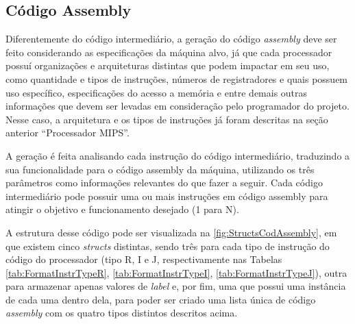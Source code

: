 \documentclass[
	12pt,				%
	oneside,
	a4paper,			%
	english,			%
	french,				%
	spanish,			%
	brazil,				%
	]{abntex2}
\begin{document}
\subsection{Código Assembly}

Diferentemente do código intermediário, a geração do código \emph{assembly} deve ser feito considerando as especificações da máquina alvo, já que cada processador possuí organizações e arquiteturas distintas que podem impactar em seu uso, como quantidade e tipos de instruções, números de registradores e quais possuem uso específico, especificações do acesso a memória e entre demais outras informações que devem ser levadas em consideração pelo programador do projeto. Nesse caso, a arquitetura e os tipos de instruções já foram descritas na seção anterior ``Processador MIPS''.

A geração é feita analisando cada instrução do código intermediário, traduzindo a sua funcionalidade para o código assembly da máquina, utilizando os três parâmetros como informações relevantes do que fazer a seguir. Cada código intermediário pode possuir uma ou mais instruções em código assembly para atingir o objetivo e funcionamento desejado (1 para N).

A estrutura desse código pode ser visualizada na \autoref{fig:StructsCodAssembly}, em que existem cinco \emph{structs} distintas, sendo três para cada tipo de instrução do código do processador (tipo R, I e J, respectivamente nas Tabelas \ref{tab:FormatInstrTypeR}, \ref{tab:FormatInstrTypeI}, \ref{tab:FormatInstrTypeJ}), outra para armazenar apenas valores de \emph{label} e, por fim, uma que possui uma instância de cada uma dentro dela, para poder ser criado uma lista única de código \emph{assembly} com os quatro tipos distintos descritos acima.
\end{document}
